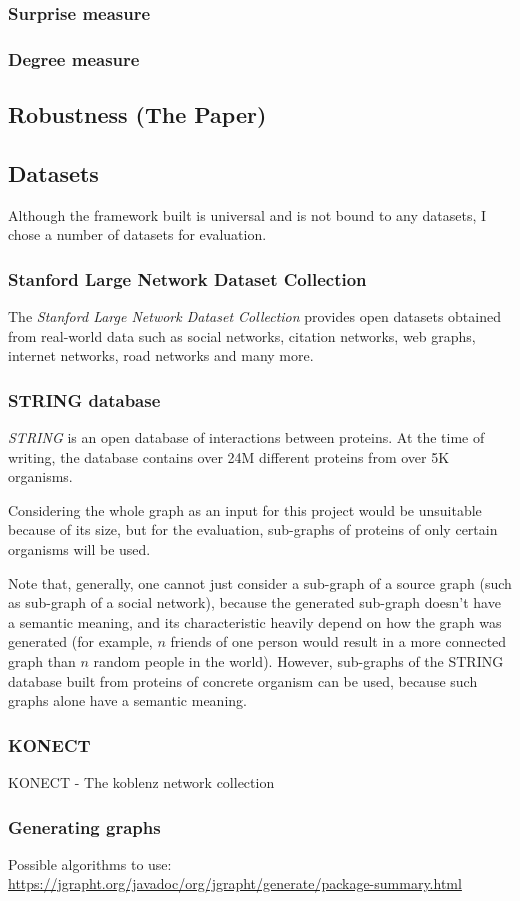 \subsubsection{Surprise measure}

\subsubsection{Degree measure}

\subsection{Robustness (The Paper)}

\subsection{Datasets}

Although the framework built is universal and is not bound to any datasets, I chose a number of datasets for evaluation.

\subsubsection{Stanford Large Network Dataset Collection}

The \textit{Stanford Large Network Dataset Collection}\cite{Large2016} provides open datasets obtained from real-world data such as social networks, citation networks, web graphs, internet networks, road networks and many more.

\subsubsection{STRING database}

\textit{STRING}\cite{Szklarczyk2019} is an open database of interactions between proteins.
At the time of writing, the database contains over 24M different proteins from over 5K organisms.

Considering the whole graph as an input for this project would be unsuitable because of its size, but for the evaluation, sub-graphs of proteins of only certain organisms will be used.

Note that, generally, one cannot just consider a sub-graph of a source graph (such as sub-graph of a social network), because the generated sub-graph doesn't have a semantic meaning, and its characteristic heavily depend on how the graph was generated (for example, $n$ friends of one person would result in a more connected graph than $n$ random people in the world).
However, sub-graphs of the STRING database built from proteins of concrete organism can be used, because such graphs alone have a semantic meaning.

\subsubsection{KONECT}

KONECT - The koblenz network collection\cite{Kunegis2013}

\subsubsection{Generating graphs}

Possible algorithms to use: \url{https://jgrapht.org/javadoc/org/jgrapht/generate/package-summary.html}


